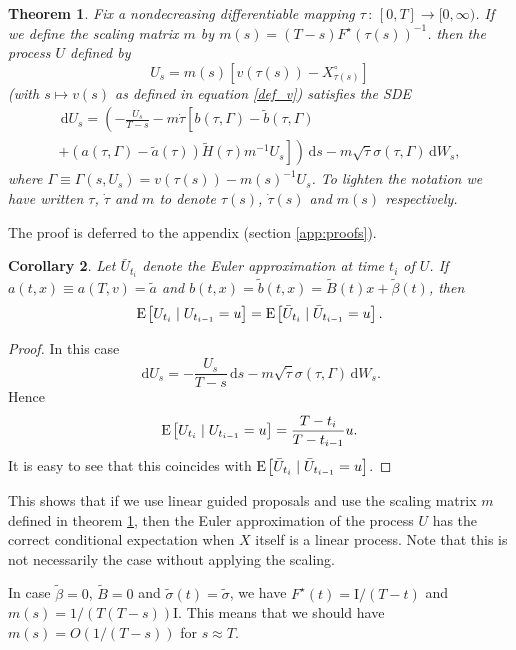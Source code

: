 \documentclass[preprint]{imsart}
\newcommand{\si}{\sigma}
\renewcommand{\tilde}{\widetilde}
\providecommand{\I}{\mathrm{I}}
\newtheorem{thm}{Theorem}[section]
\newtheorem{cll}[thm]{Corollary}
\theoremstyle{definition}
\newcommand{\dd}{{\,\mathrm d}}
\newcommand{\expec}[1]{\ensuremath{{\rm E}\mspace{-1mu}\left[#1\right]}}
\begin{document}
\begin{thm}\label{thm:tcou}
Fix a nondecreasing differentiable mapping $\tau\,:\,[0,T] \to [0,\infty)$. 
If we define the scaling matrix $m$ by 
$ m(s) =  (T-s){F^\star}(\tau(s))^{-1}$. 
then the process $U$ defined by 
\[
U_s =   m(s) \left[v(\tau(s)) -  X^\circ_{\tau(s)} \right]
\]
(with $s\mapsto v(s)$ as defined in equation \eqref{def_v}) satisfies the SDE
\begin{multline*}
\dd U_s = \left( -\frac{U_s}{T-s} - m\dot\tau\left[b(\tau, \Gamma)-\tilde b(\tau, \Gamma) \right.\right.\\ \left.\left.   + ( a(\tau, \Gamma)-\tilde{a}(\tau)) \tilde H(\tau) m^{-1} U_s\right] \right)\dd s - m\sqrt{\dot\tau} \si(\tau, \Gamma)\dd W_s,
\end{multline*}
where   $\Gamma\equiv \Gamma(s,U_s)=v(\tau(s))-m(s)^{-1} U_s$. To lighten the notation we have written $\tau$, $\dot\tau$ and $m$ to denote $\tau(s)$, $\dot\tau(s)$ and $m(s)$ respectively.
\end{thm}
The proof is deferred to the appendix (section \ref{app:proofs}). 
\begin{cll}\label{cor:euler-good}
Let $\bar U_{t_i}$ denote the Euler approximation at time $t_i$ of $U$. 
If $a(t,x) \equiv a(T,v)=\tilde{a}$ and $b(t,x)=\tilde{b}(t,x) = \tilde{B}(t) x + \tilde\beta(t)$, then 
\[
\expec{U_{t_i} \mid U_{t_{i-1}} = u} = \expec{\bar U_{t_i} \mid \bar U_{t_{i-1}} = u}. 
\]
\end{cll}
\begin{proof}
In this case 
\[	\dd U_s = -\frac{U_s}{T-s}\dd s - m\sqrt{\dot\tau} \si(\tau, \Gamma)\dd W_s.
\]
Hence 
\[	\expec{U_{t_i} \mid U_{t_{i-1}} = u}=\frac{T-t_i}{T-t_{i-1}} u . \]
 It is easy to see that this coincides  with $\expec{\bar U_{t_i} \mid \bar U_{t_{i-1}} = u} $.
\end{proof} 

This shows that if we use linear guided proposals and use the scaling matrix $m$ defined in theorem \ref{thm:tcou}, then the Euler approximation of the process $U$ has the correct conditional expectation when $X$ itself is a linear process. Note that this is not necessarily the case without applying the scaling. 


In case $\tilde\beta=0$, $\tilde{B}=0$ and $\tilde\si(t)=\tilde\si$, we have $F^\star(t)=\I/(T-t)$ and $m(s)=1/(T(T-s)) \I$. This means that we should have $m(s)=O(1/(T-s))$ for $s\approx T$. 
\end{document}
